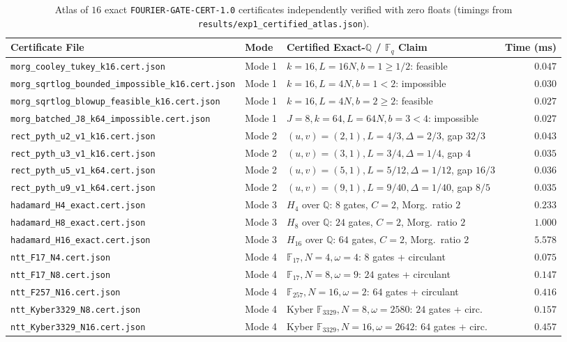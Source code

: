 \documentclass[11pt,a4paper]{article}
\theoremstyle{definition}
\theoremstyle{remark}
\newcommand{\QQ}{\mathbb{Q}}
\newcommand{\FF}{\mathbb{F}}
\newcommand{\certschema}{\texttt{FOURIER-GATE-CERT-1.0}}
\begin{document}
\begin{table}[t]
\centering
\caption{Atlas of $16$ exact \certschema{} certificates independently verified with zero floats (timings from \texttt{results/exp1\_certified\_atlas.json}).}
\label{tab:atlas}
\scriptsize
\setlength{\tabcolsep}{2pt}
\begin{tabular}{@{}lllr@{}}
\toprule
Certificate File & Mode & Certified Exact-$\QQ$ / $\FF_q$ Claim & Time (ms) \\
\midrule
\texttt{morg\_cooley\_tukey\_k16.cert.json} & Mode 1 & $k=16, L=16N, b=1 \ge 1/2$: feasible & $0.047$ \\
\texttt{morg\_sqrtlog\_bounded\_impossible\_k16.cert.json} & Mode 1 & $k=16, L=4N, b=1 < 2$: impossible & $0.030$ \\
\texttt{morg\_sqrtlog\_blowup\_feasible\_k16.cert.json} & Mode 1 & $k=16, L=4N, b=2 \ge 2$: feasible & $0.027$ \\
\texttt{morg\_batched\_J8\_k64\_impossible.cert.json} & Mode 1 & $J=8, k=64, L=64N, b=3 < 4$: impossible & $0.027$ \\
\midrule
\texttt{rect\_pyth\_u2\_v1\_k16.cert.json} & Mode 2 & $(u,v)=(2,1), L=4/3, \Delta=2/3$, gap $32/3$ & $0.043$ \\
\texttt{rect\_pyth\_u3\_v1\_k16.cert.json} & Mode 2 & $(u,v)=(3,1), L=3/4, \Delta=1/4$, gap $4$ & $0.035$ \\
\texttt{rect\_pyth\_u5\_v1\_k64.cert.json} & Mode 2 & $(u,v)=(5,1), L=5/12, \Delta=1/12$, gap $16/3$ & $0.036$ \\
\texttt{rect\_pyth\_u9\_v1\_k64.cert.json} & Mode 2 & $(u,v)=(9,1), L=9/40, \Delta=1/40$, gap $8/5$ & $0.035$ \\
\midrule
\texttt{hadamard\_H4\_exact.cert.json} & Mode 3 & $H_4$ over $\QQ$: $8$ gates, $C=2$, Morg.\ ratio $2$ & $0.233$ \\
\texttt{hadamard\_H8\_exact.cert.json} & Mode 3 & $H_8$ over $\QQ$: $24$ gates, $C=2$, Morg.\ ratio $2$ & $1.000$ \\
\texttt{hadamard\_H16\_exact.cert.json} & Mode 3 & $H_{16}$ over $\QQ$: $64$ gates, $C=2$, Morg.\ ratio $2$ & $5.578$ \\
\midrule
\texttt{ntt\_F17\_N4.cert.json} & Mode 4 & $\FF_{17}, N=4, \omega=4$: $8$ gates + circulant & $0.075$ \\
\texttt{ntt\_F17\_N8.cert.json} & Mode 4 & $\FF_{17}, N=8, \omega=9$: $24$ gates + circulant & $0.147$ \\
\texttt{ntt\_F257\_N16.cert.json} & Mode 4 & $\FF_{257}, N=16, \omega=2$: $64$ gates + circulant & $0.416$ \\
\texttt{ntt\_Kyber3329\_N8.cert.json} & Mode 4 & Kyber $\FF_{3329}, N=8, \omega=2580$: $24$ gates + circ. & $0.157$ \\
\texttt{ntt\_Kyber3329\_N16.cert.json} & Mode 4 & Kyber $\FF_{3329}, N=16, \omega=2642$: $64$ gates + circ. & $0.457$ \\
\bottomrule
\end{tabular}
\end{table}
\end{document}
